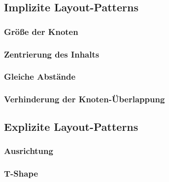 

\subsection{Implizite Layout-Patterns}

\subsubsection{Größe der Knoten}
\subsubsection{Zentrierung des Inhalts}
\subsubsection{Gleiche Abstände}
\subsubsection{Verhinderung der Knoten-Überlappung}

\subsection{Explizite Layout-Patterns}


\subsubsection{Ausrichtung}


\subsubsection{T-Shape}

